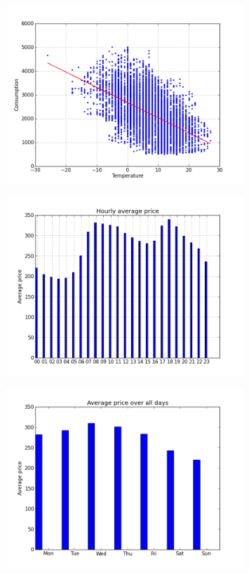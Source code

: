 \begin{figure}[h!]
\centering
\includegraphics[width=0.8\textwidth ,natwidth=410,natheight=237]{billeder/energy_price_plots/consump_temp.png}
\caption{}
\label{fig:}
\end{figure}

\begin{figure}[h!]
\centering
\includegraphics[width=0.8\textwidth ,natwidth=410,natheight=237]{billeder/energy_price_plots/hourly_average.png}
\caption{}
\label{fig:}
\end{figure}

\begin{figure}[h!]
\centering
\includegraphics[width=0.8\textwidth ,natwidth=410,natheight=237]{billeder/energy_price_plots/price_per_day.png}
\caption{}
\label{fig:}
\end{figure}


